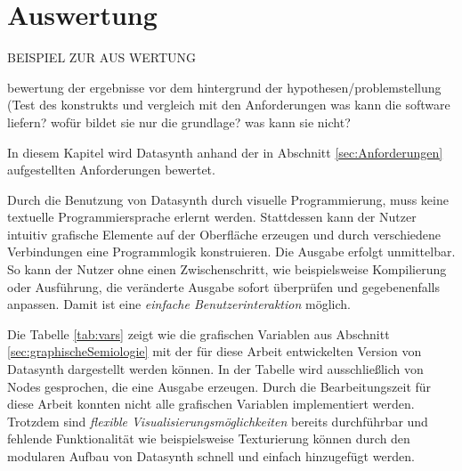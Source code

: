 \documentclass[a4paper, 12pt, DIVcalc, onepage, pdftex, headsepline, footsepline]{scrreprt}
\begin{document}
\chapter{Auswertung}
\label{cha:Auswertung}

BEISPIEL ZUR AUS WERTUNG

bewertung der ergebnisse vor dem hintergrund der hypothesen/problemstellung (Test des konstrukts und vergleich mit den Anforderungen
was kann die software liefern? wofür bildet sie nur die grundlage? was kann sie nicht?

In diesem Kapitel wird Datasynth anhand der in Abschnitt \ref{sec:Anforderungen}
aufgestellten Anforderungen bewertet.

Durch die Benutzung von Datasynth durch visuelle Programmierung, muss keine
textuelle Programmiersprache erlernt werden. Stattdessen kann der Nutzer intuitiv
grafische Elemente auf der Oberfläche erzeugen und durch verschiedene Verbindungen
eine Programmlogik konstruieren. Die Ausgabe erfolgt unmittelbar. So kann der Nutzer
ohne einen Zwischenschritt, wie beispielsweise Kompilierung oder Ausführung, die
veränderte Ausgabe sofort überprüfen und gegebenenfalls anpassen. Damit ist eine
\textit{einfache Benutzerinteraktion} möglich.

Die Tabelle \ref{tab:vars} zeigt wie die grafischen Variablen aus Abschnitt
\ref{sec:graphischeSemiologie} mit der für diese Arbeit entwickelten Version von
Datasynth dargestellt werden können. In der Tabelle wird ausschließlich
von Nodes gesprochen, die eine Ausgabe erzeugen.
Durch die Bearbeitungszeit für diese Arbeit konnten nicht alle grafischen
Variablen implementiert werden. Trotzdem sind \textit{flexible Visualisierungsmöglichkeiten}
bereits durchführbar und fehlende Funktionalität wie beispielsweise Texturierung können
durch den modularen Aufbau von Datasynth schnell und einfach hinzugefügt werden.
\end{document}
